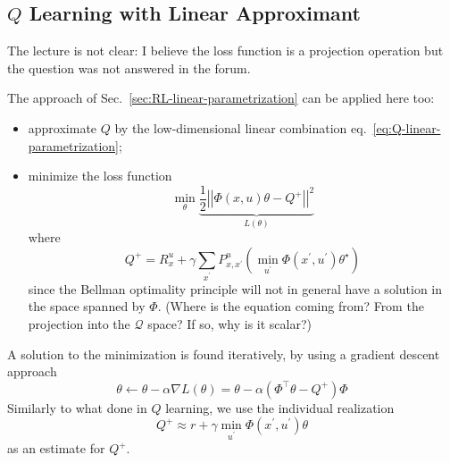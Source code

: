 \subsection{$Q$ Learning with Linear Approximant}

The lecture is not clear: I believe the loss function is a projection operation but the question was not answered in the forum.

The approach of Sec.~\ref{sec:RL-linear-parametrization} can be applied here too:
\begin{itemize}
\item approximate $Q$ by the low-dimensional linear combination eq.~\eqref{eq:Q-linear-parametrization};
\item minimize the loss function
  \begin{equation*}
    \min_\theta \underbrace{\frac{1}{2} \left|\!\left|\Phi(x,u)\theta - Q^+\right|\!\right|^2}_{L(\theta)}
  \end{equation*}
  where
  \begin{equation*}
    Q^+ = R_x^u + \gamma \sum_{x^\prime} P_{x,x^\prime}^u \left(\min_{u^\prime} \Phi(x^\prime,u^\prime)\theta^\star\right)
  \end{equation*}
  since the Bellman optimality principle will not in general have a solution in the space spanned by $\Phi$. (Where is the equation coming from? From the projection into the $\mathcal{Q}$ space? If so, why is it scalar?)
\end{itemize}
A solution to the minimization is found iteratively, by using a gradient descent approach
\begin{equation*}
  \theta \leftarrow \theta - \alpha \nabla L(\theta) = \theta - \alpha \left(\Phi^\top\theta - Q^+\right)\Phi
\end{equation*}
Similarly to what done in $Q$ learning, we use the individual realization
\begin{equation*}
  Q^+\approx r + \gamma \min_{u^\prime} \Phi(x^\prime,u^\prime)\theta
\end{equation*}
as an estimate for $Q^+$.



